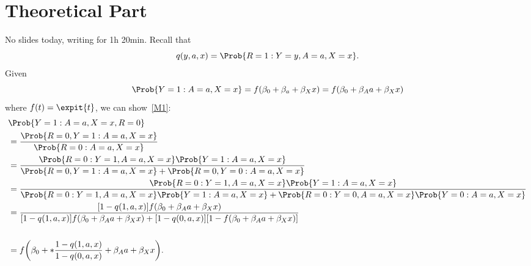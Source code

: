 \section*{Theoretical Part}
No slides today, writing for 1h 20min. Recall that
\[ q(y,a,x)=\Prob{R=1\given Y=y,A=a,X=x}. \]
Given
\[ \Prob{Y=1\given A=a,X=x}=f(\beta_0+\beta_a+\beta_X x)
      =f(\beta_0+\beta_A a+\beta_X x) \]
where $ f(t)=\expit{t} $, we can show~\ref{M1}:
\begin{align*}
       & \Prob{Y=1\given A=a,X=x,R=0}                                                                                                                                             \\
       & =\frac{\Prob{R=0,Y=1\given A=a,X=x}}{\Prob{R=0\given A=a,X=x}}                                                                                                           \\
       & =\frac{\Prob{R=0\given Y=1, A=a,X=x}\Prob{Y=1\given A=a,X=x}}{\Prob{R=0,Y=1\given A=a,X=x}+\Prob{R=0,Y=0\given A=a,X=x}}                                                 \\
       & =\frac{\Prob{R=0\given Y=1, A=a,X=x}\Prob{Y=1\given A=a,X=x}}{\Prob{R=0\given Y=1,A=a,X=x}\Prob{Y=1\given A=a,X=x}+\Prob{R=0\given Y=0,A=a,X=x}\Prob{Y=0\given A=a,X=x}} \\
       & =\frac{[1-q(1,a,x)]f(\beta_0+\beta_A a+\beta_X x)}{[1-q(1,a,x)]f(\beta_0+\beta_A a+\beta_X x)+[1-q(0,a,x)][1-f(\beta_0+\beta_A a+\beta_X x)]}                            \\                                                                                     \\
       & =f\biggl(\beta_0+\log*{\frac{1-q(1,a,x)}{1-q(0,a,x)}}+\beta_A a+\beta_X x\biggr).
\end{align*}
